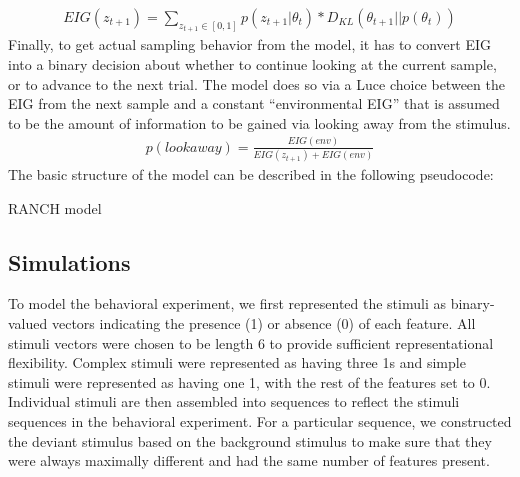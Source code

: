 \documentclass[10pt, letterpaper]{article}
\begin{document}
\begin{eqnarray}
EIG(z_{t+1}) = \sum_{z_{t+1} \in [0,1]} p(z_{t+1}|\theta_t) * D_{KL}(\theta_{t+1} || p(\theta_t))
\end{eqnarray} Finally, to get actual sampling behavior from the model,
it has to convert EIG into a binary decision about whether to continue
looking at the current sample, or to advance to the next trial. The
model does so via a Luce choice between the EIG from the next sample and
a constant ``environmental EIG'' that is assumed to be the amount of
information to be gained via looking away from the stimulus.
\begin{eqnarray}
p(look away) = \frac{EIG(env)}{EIG(z_{t+1})+EIG(env)}
\end{eqnarray} The basic structure of the model can be described in the
following pseudocode:

\begin{algorithm}[h]
  \caption*{RANCH model}\label{msn}
  \begin{algorithmic}
  \NoDo{}
    \NoThen{}
    \EndIf
    \EndWhile
  \EndFor
\end{algorithmic}
  \end{algorithm}

\hypertarget{simulations}{%
\subsection{Simulations}\label{simulations}}

To model the behavioral experiment, we first represented the stimuli as
binary-valued vectors indicating the presence (1) or absence (0) of each
feature. All stimuli vectors were chosen to be length 6 to provide
sufficient representational flexibility. Complex stimuli were
represented as having three 1s and simple stimuli were represented as
having one 1, with the rest of the features set to 0. Individual stimuli
are then assembled into sequences to reflect the stimuli sequences in
the behavioral experiment. For a particular sequence, we constructed the
deviant stimulus based on the background stimulus to make sure that they
were always maximally different and had the same number of features
present.
\end{document}
